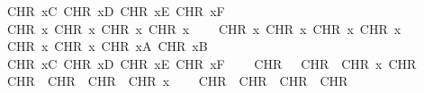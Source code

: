 \begin{isabellebody}
\ \ \ \ CHR\ {}x{}C{\isacharcomma}{\kern0pt}\ CHR\ {}x{}D{\isacharcomma}{\kern0pt}\ CHR\ {}x{}E{\isacharcomma}{\kern0pt}\ CHR\ {}x{}F{\isacharcomma}{\kern0pt}\isanewline
\ \ \ \ CHR\ {}x{}{}{\isacharcomma}{\kern0pt}\ CHR\ {}x{}{}{\isacharcomma}{\kern0pt}\ CHR\ {}x{}{}{\isacharcomma}{\kern0pt}\ CHR\ {}x{}{}{\isacharcomma}{\kern0pt}\isanewline
\ \ \ \ CHR\ {}x{}{}{\isacharcomma}{\kern0pt}\ CHR\ {}x{}{}{\isacharcomma}{\kern0pt}\ CHR\ {}x{}{}{\isacharcomma}{\kern0pt}\ CHR\ {}x{}{}{\isacharcomma}{\kern0pt}\isanewline
\ \ \ \ CHR\ {}x{}{}{\isacharcomma}{\kern0pt}\ CHR\ {}x{}{}{\isacharcomma}{\kern0pt}\ CHR\ {}x{}A{\isacharcomma}{\kern0pt}\ CHR\ {}x{}B{\isacharcomma}{\kern0pt}\isanewline
\ \ \ \ CHR\ {}x{}C{\isacharcomma}{\kern0pt}\ CHR\ {}x{}D{\isacharcomma}{\kern0pt}\ CHR\ {}x{}E{\isacharcomma}{\kern0pt}\ CHR\ {}x{}F{\isacharcomma}{\kern0pt}\isanewline
\ \ \ \ CHR\ {\isacharprime}{\kern0pt}{\isacharprime}{\kern0pt}\ {\isacharprime}{\kern0pt}{\isacharprime}{\kern0pt}{\isacharcomma}{\kern0pt}\ CHR\ {\isacharprime}{\kern0pt}{\isacharprime}{\kern0pt}{\isacharbang}{\kern0pt}{\isacharprime}{\kern0pt}{\isacharprime}{\kern0pt}{\isacharcomma}{\kern0pt}\ CHR\ {}x{}{}{\isacharcomma}{\kern0pt}\ CHR\ {\isacharprime}{\kern0pt}{\isacharprime}{\kern0pt}{\isacharhash}{\kern0pt}{\isacharprime}{\kern0pt}{\isacharprime}{\kern0pt}{\isacharcomma}{\kern0pt}\isanewline
\ \ \ \ CHR\ {\isacharprime}{\kern0pt}{\isacharprime}{\kern0pt}{\isachardollar}{\kern0pt}{\isacharprime}{\kern0pt}{\isacharprime}{\kern0pt}{\isacharcomma}{\kern0pt}\ CHR\ {\isacharprime}{\kern0pt}{\isacharprime}{\kern0pt}{\isacharpercent}{\kern0pt}{\isacharprime}{\kern0pt}{\isacharprime}{\kern0pt}{\isacharcomma}{\kern0pt}\ CHR\ {\isacharprime}{\kern0pt}{\isacharprime}{\kern0pt}{\isacharampersand}{\kern0pt}{\isacharprime}{\kern0pt}{\isacharprime}{\kern0pt}{\isacharcomma}{\kern0pt}\ CHR\ {}x{}{}{\isacharcomma}{\kern0pt}\isanewline
\ \ \ \ CHR\ {\isacharprime}{\kern0pt}{\isacharprime}{\kern0pt}{\isacharparenleft}{\kern0pt}{\isacharprime}{\kern0pt}{\isacharprime}{\kern0pt}{\isacharcomma}{\kern0pt}\ CHR\ {\isacharprime}{\kern0pt}{\isacharprime}{\kern0pt}{\isacharparenright}{\kern0pt}{\isacharprime}{\kern0pt}{\isacharprime}{\kern0pt}{\isacharcomma}{\kern0pt}\ CHR\ {\isacharprime}{\kern0pt}{\isacharprime}{\kern0pt}{\isacharasterisk}{\kern0pt}{\isacharprime}{\kern0pt}{\isacharprime}{\kern0pt}{\isacharcomma}{\kern0pt}\ CHR\ {\isacharprime}{\kern0pt}{\isacharprime}{\kern0pt}{\isacharplus}{\kern0pt}{\isacharprime}{\kern0pt}{\isacharprime}{\kern0pt}{\isacharcomma}{\kern0pt}\isanewline

\end{isabellebody}
